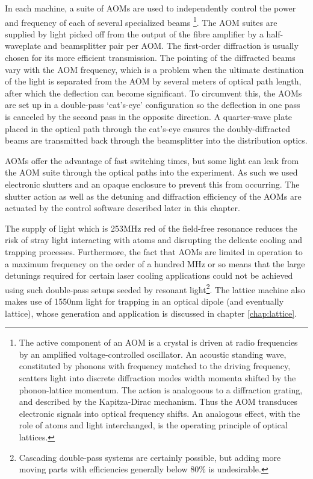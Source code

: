	In each machine, a suite of AOMs are used to independently control the power and frequency of each of several specialized beams \footnote{The active component of an AOM is a crystal is driven at radio frequencies by an amplified voltage-controlled oscillator.	An acoustic standing wave, constituted by phonons with frequency matched to the driving frequency, scatters light into discrete diffraction modes width momenta shifted by the phonon-lattice momentum.	The action is analogoous to a diffraction grating, and described by the Kapitza-Dirac mechanism.	Thus the AOM transduces electronic signals into optical frequency shifts.	An analogous effect, with the role of atoms and light interchanged, is the operating principle of optical lattices.}.
	The AOM suites are supplied by light picked off from the output of the fibre amplifier by a half-waveplate and beamsplitter pair per AOM.
	The first-order diffraction is usually chosen for its more efficient transmission.
	The pointing of the diffracted beams vary with the AOM frequency, which is a problem when the ultimate destination of the light is separated from the AOM by several meters of optical path length, after which the deflection can become significant.
	To circumvent this, the AOMs are set up in a double-pass `cat's-eye' configuration so the deflection in one pass is canceled by the second pass in the opposite direction.
	A quarter-wave plate placed in the optical path through the cat's-eye ensures the doubly-diffracted beams are transmitted back through the beamsplitter into the distribution optics.
	
	AOMs offer the advantage of fast switching times, but some light can leak from the AOM suite through the optical paths into the experiment.
	As such we used electronic shutters and an opaque enclosure to prevent this from occurring.
	The shutter action as well as the detuning and diffraction efficiency of the AOMs are actuated by the control software described later in this chapter.
	
	The supply of light which is 253MHz red of the field-free resonance reduces the risk of stray light interacting with atoms and disrupting the delicate cooling and trapping processes.
	Furthermore, the fact that AOMs are limited in operation to a maximum frequency on the order of a hundred MHz or so means that the large detunings required for certain laser cooling applications could not be achieved using such double-pass setups seeded by resonant light\footnote{Cascading double-pass systems are certainly possible, but adding more moving parts with efficiencies generally below 80\% is undesirable.}.
	The lattice machine also makes use of 1550nm light for trapping in an optical dipole (and eventually lattice), whose generation and application is discussed in chapter \ref{chap:lattice}.	


